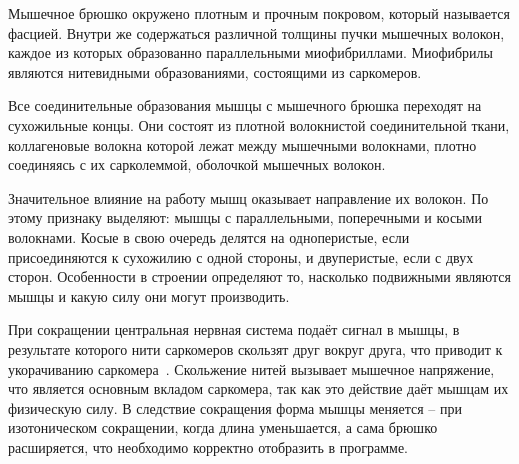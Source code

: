 \par Мышечное брюшко окружено плотным и прочным покровом, который называется фасцией. Внутри же содержаться различной толщины пучки мышечных волокон, каждое из которых образованно параллельными миофибриллами. Миофибрилы являются нитевидными образованиями, состоящими из саркомеров. 
\par Все соединительные образования мышцы с мышечного брюшка переходят на сухожильные концы. Они состоят из плотной волокнистой соединительной ткани, коллагеновые волокна которой лежат между мышечными волокнами, плотно соединяясь с их сарколеммой, оболочкой мышечных волокон.
\par Значительное влияние на работу мышц оказывает направление их волокон. По этому признаку выделяют: мышцы с параллельными, поперечными и косыми волокнами. Косые в свою очередь делятся на одноперистые, если присоединяются к сухожилию с одной стороны, и двуперистые, если с двух сторон. Особенности в строении определяют то, насколько подвижными являются мышцы и какую силу они могут производить.
\par При сокращении центральная нервная система подаёт сигнал в мышцы, в результате которого нити саркомеров скользят друг вокруг друга, что приводит к укорачиванию саркомера~\cite{muscle_03}. Скольжение нитей вызывает мышечное напряжение, что является основным вкладом саркомера, так как это действие даёт мышцам их физическую силу. В следствие сокращения форма мышцы меняется -- при изотоническом сокращении, когда длина уменьшается, а сама брюшко расширяется, что необходимо корректно отобразить в программе.
